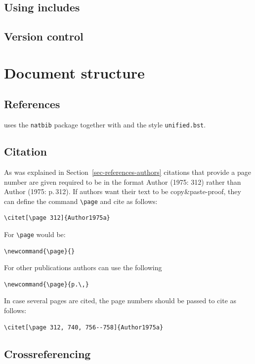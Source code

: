 \subsection{Using includes}

\subsection{Version control}


\section{Document structure}




\subsection{References}

\lsp uses the \texttt{natbib} package together with \bibtex{} and the \bibtex style \texttt{unified.bst}.


\subsection{Citation}

As was explained in Section~\ref{sec-references-authors} citations that provide a page number are
given required to be in the format Author (1975: 312) rather than Author (1975: p.\,312). If authors
want their text to be copy\&paste-proof, they can define the command \verb+\page+ and cite as
follows:
\begin{verbatim}
\citet[\page 312]{Author1975a}
\end{verbatim}
For \lsp \verb+\page+ would be:
\begin{verbatim}
\newcommand{\page}{}
\end{verbatim}
For other publications authors can use the following
\begin{verbatim}
\newcommand{\page}{p.\,}
\end{verbatim}
In case several pages are cited, the page numbers should be passed to cite as follows:
\begin{verbatim}
\citet[\page 312, 740, 756--758]{Author1975a}
\end{verbatim}


\subsection{Crossreferencing}

